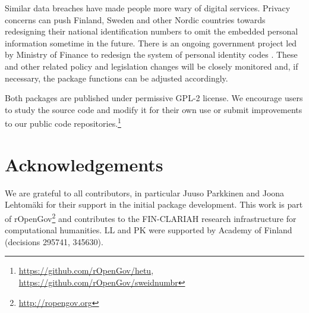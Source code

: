 Similar data breaches have made people more wary of digital services. Privacy concerns can push Finland, Sweden and other Nordic countries towards redesigning their national identification numbers to omit the embedded personal information sometime in the future. There is an ongoing government project led by Ministry of Finance to redesign the system of personal identity codes \citep{hetuvm}. These and other related policy and legislation changes will be closely monitored and, if necessary, the package functions can be adjusted accordingly.

Both packages are published under permissive GPL-2 license. We encourage users to study the source code and modify it for their own use or submit improvements to our public code repositories.\footnote{\url{https://github.com/rOpenGov/hetu}, \url{https://github.com/rOpenGov/sweidnumbr}}

\section{Acknowledgements}

We are grateful to all contributors, in particular Juuso Parkkinen and Joona Lehtomäki for their support in the initial package development. This work is part of rOpenGov\footnote{\url{http://ropengov.org}} and contributes to the FIN-CLARIAH research infrastructure for computational humanities. LL and PK were supported by Academy of Finland (decisions 295741, 345630).



\address{Pyry Kantanen\\
  Department of Computing\\
  PO Box 20014 University of Turku\\
  Finland\\
  ORCiD: 0000-0003-2853-2765\\
  }
  
\address{Måns Magnusson\\
  Department of Statistics\\
  Uppsala University\\
  Sweden\\
  ORCiD: 0000-0002-0296-2719\\
  }

\address{Leo Lahti\\
  Department of Computing\\
  PO Box 20014 University of Turku\\
  Finland\\
  ORCiD: 0000-0001-5537-637X\\
  }
